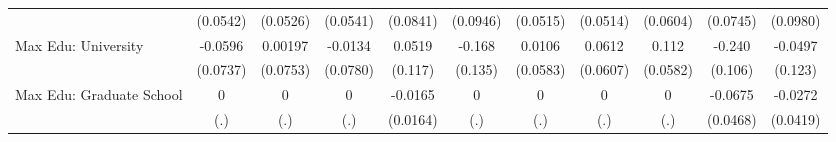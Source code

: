 {\begin{tabular}{l*{10}{c}}
            &    (0.0542)         &    (0.0526)         &    (0.0541)         &    (0.0841)         &    (0.0946)         &    (0.0515)         &    (0.0514)         &    (0.0604)         &    (0.0745)         &    (0.0980)         \\
\addlinespace
Max Edu: University&     -0.0596         &     0.00197         &     -0.0134         &      0.0519         &      -0.168         &      0.0106         &      0.0612         &       0.112         &      -0.240\sym{*}  &     -0.0497         \\
            &    (0.0737)         &    (0.0753)         &    (0.0780)         &     (0.117)         &     (0.135)         &    (0.0583)         &    (0.0607)         &    (0.0582)         &     (0.106)         &     (0.123)         \\
\addlinespace
Max Edu: Graduate School&           0         &           0         &           0         &     -0.0165         &           0         &           0         &           0         &           0         &     -0.0675         &     -0.0272         \\
            &         (.)         &         (.)         &         (.)         &    (0.0164)         &         (.)         &         (.)         &         (.)         &         (.)         &    (0.0468)         &    (0.0419)         \\
\bottomrule
\end{tabular}
}
